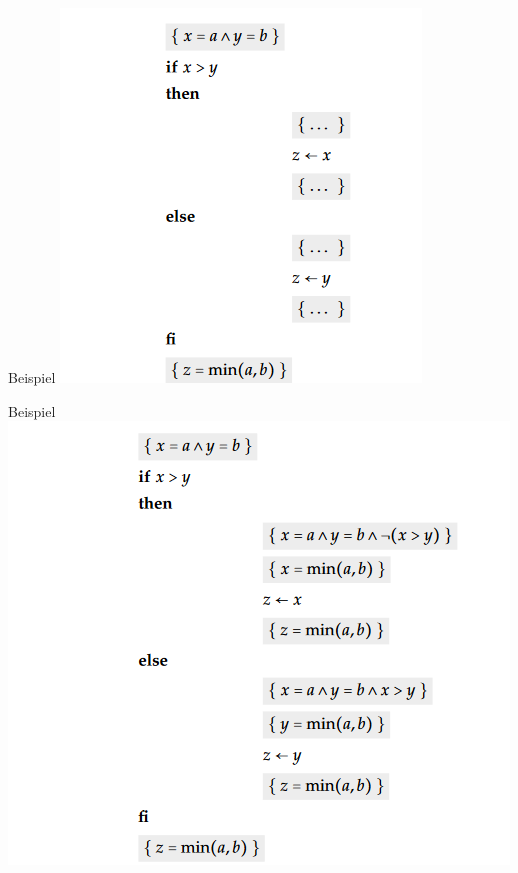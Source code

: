 \begin{frame}{Beispiel}
	\includegraphics[scale=0.6]{images/if_fi.PNG}
\end{frame}		

\begin{frame}{Beispiel}
	\includegraphics[scale=0.6]{images/if_fi_loes.PNG}
\end{frame}		


